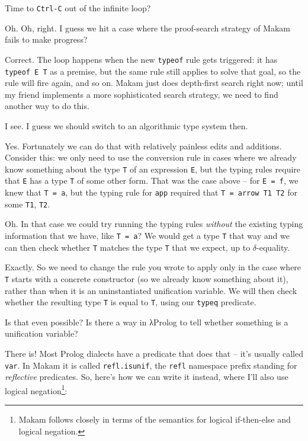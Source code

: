 \heroADVISOR{} Time to \texttt{Ctrl-C} out of the infinite loop?

\heroSTUDENT{} Oh. Oh, right. I guess we hit a case where the proof-search
strategy of Makam fails to make progress?

\heroADVISOR{} Correct. The loop happens when the new \texttt{typeof} rule
gets triggered: it has \texttt{typeof\ E\ T\textquotesingle{}} as a
premise, but the same rule still applies to solve that goal, so the rule
will fire again, and so on. Makam just does depth-first search right
now; until my friend implements a more sophisticated search strategy, we
need to find another way to do this.

\heroSTUDENT{} I see. I guess we should switch to an algorithmic type system
then.

\heroADVISOR{} Yes. Fortunately we can do that with relatively painless edits
and additions. Consider this: we only need to use the conversion rule in
cases where we already know something about the type \texttt{T} of an
expression \texttt{E}, but the typing rules require that \texttt{E} has
a type \texttt{T\textquotesingle{}} of some other form. That was the
case above -- for \texttt{E\ =\ f}, we knew that \texttt{T\ =\ a}, but
the typing rule for \texttt{app} required that
\texttt{T\textquotesingle{}\ =\ arrow\ T1\ T2} for some \texttt{T1},
\texttt{T2}.

\heroSTUDENT{} Oh. In that case we could try running the typing rules
\emph{without} the existing typing information that we have, like
\texttt{T\ =\ a}? We would get a type \texttt{T\textquotesingle{}} that
way and we can then check whether \texttt{T\textquotesingle{}} matches
the type \texttt{T} that we expect, up to \(\delta\)-equality.

\heroADVISOR{} Exactly. So we need to change the rule you wrote to apply only
in the case where \texttt{T} starts with a concrete constructor (so we
already know something about it), rather than when it is an
uninstantiated unification variable. We will then check whether the
resulting type \texttt{T\textquotesingle{}} is equal to \texttt{T},
using our \texttt{typeq} predicate.

\heroSTUDENT{} Is that even possible? Is there a way in \foreignlanguage{greek}{λ}Prolog to tell
whether something is a unification variable?

\heroADVISOR{} There is! Most Prolog dialects have a predicate that does that
-- it's usually called \texttt{var}. In Makam it is called
\texttt{refl.isunif}, the \texttt{refl} namespace prefix standing for
\emph{reflective} predicates. So, here's how we can write it instead,
where I'll also use logical
negation\footnote{Makam follows \citet{kiselyov05backtracking} closely in terms of the semantics for logical if-then-else and logical negation.}:


